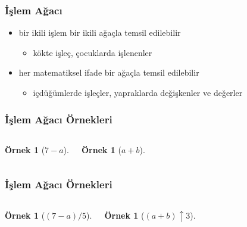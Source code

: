 \documentclass[dvipsnames]{beamer}
\theoremstyle{definition}
\theoremstyle{example}
\newtheorem{ornek}[theorem]{Örnek}
\theoremstyle{plain}
\begin{document}
\begin{frame}
  \frametitle{İşlem Ağacı}

  \begin{itemize}
    \item bir ikili işlem bir ikili ağaçla temsil edilebilir
    \begin{itemize}
      \item kökte işleç, çocuklarda işlenenler
    \end{itemize}

    \medskip
    \item her matematiksel ifade bir ağaçla temsil edilebilir
    \begin{itemize}
      \item içdüğümlerde işleçler, yapraklarda değişkenler ve değerler
    \end{itemize}
  \end{itemize}
\end{frame}

\begin{frame}
  \frametitle{İşlem Ağacı Örnekleri}

  \begin{columns}[t]
    \begin{ornek}[$7-a$]
      \begin{center}
      \end{center}
    \end{ornek}

    \begin{ornek}[$a+b$]
      \begin{center}
      \end{center}
    \end{ornek}
  \end{columns}
\end{frame}

\begin{frame}
  \frametitle{İşlem Ağacı Örnekleri}

  \begin{columns}[t]
    \begin{ornek}[$(7-a)/5$]
      \begin{center}
      \end{center}
    \end{ornek}

    \begin{ornek}[$(a+b) \uparrow 3$]
      \begin{center}
      \end{center}
    \end{ornek}
  \end{columns}
\end{frame}
\end{document}
